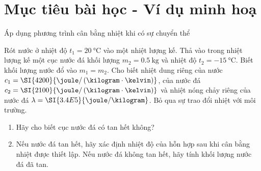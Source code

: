 \section{Mục tiêu bài học - Ví dụ minh hoạ}
\begin{dang}{Áp dụng phương trình cân bằng nhiệt khi có sự chuyển thể}
	{Rót nước ở nhiệt độ $t_1=\SI{20}{\celsius}$ vào một nhiệt lượng kế. Thả vào trong nhiệt lượng kế một cục nước đá khối lượng $m_2=\SI{0.5}{\kilogram}$ và nhiệt độ $t_2=\SI{-15}{\celsius}$. Biết khối lượng nước đổ vào $m_1=m_2$. Cho biết nhiệt dung riêng của nước $c_1=\SI{4200}{\joule/\left(\kilogram\cdot\kelvin\right)}$, của nước đá $c_2=\SI{2100}{\joule/\left(\kilogram\cdot\kelvin\right)}$ và nhiệt nóng chảy riêng của nước đá $\lambda=\SI{3.4E5}{\joule/\kilogram}$. Bỏ qua sự trao đổi nhiệt với môi trường.
	\begin{enumerate}[label=\alph*)]
		\item Hãy cho biết cục nước đá có tan hết không?
		\item Nếu nước đá tan hết, hãy xác định nhiệt độ của hỗn hợp sau khi cân bằng nhiệt được thiết lập. Nếu nước đá không tan hết, hãy tính khối lượng nước đá đã tan.
	\end{enumerate}
}
{ }
\end{dang}
